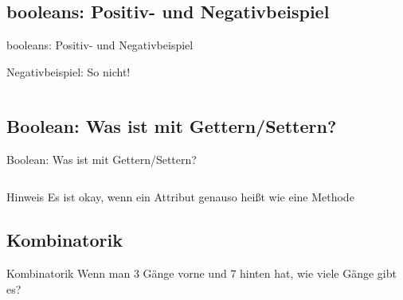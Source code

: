 \documentclass[usepdftitle=false,hyperref={pdfpagelabels=false}]{beamer}
\begin{document}
\subsection{booleans: Positiv- und Negativbeispiel}
\begin{frame}{booleans: Positiv- und Negativbeispiel}
    \begin{exampleblock}{Negativbeispiel: So nicht!}
            \inputminted[linenos=false, numbersep=5pt, tabsize=4, fontsize=\small, firstline=5, lastline=6]{java}{singleLines.java}
    \end{exampleblock}


\end{frame}

\subsection{Boolean: Was ist mit Gettern/Settern?}
\begin{frame}{Boolean: Was ist mit Gettern/Settern?}
    \inputminted[linenos=false, numbersep=5pt, tabsize=4, firstline=11, lastline=17]{java}{singleLines.java}
    \begin{block}{Hinweis}
    Es ist okay, wenn ein Attribut genauso heißt wie eine Methode
    \end{block}
\end{frame}

\subsection{Kombinatorik}
\begin{frame}{Kombinatorik}
    Wenn man 3 Gänge vorne und 7 hinten hat, wie viele Gänge gibt es?
    \vspace{1.0cm}
    \vspace{0.5cm}
    \vspace{0.2cm}

\end{frame}
\end{document}
